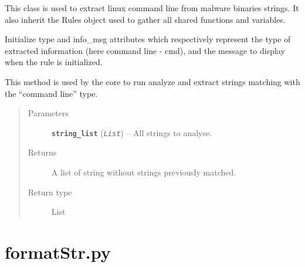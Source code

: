 \documentclass[letterpaper,10pt,oneside]{sphinxmanual}
\begin{document}
\begin{fulllineitems}
\label{index:lib.allRules.cmd.Cmd}
This class is used to extract linux command line from malware
binaries strings. It also inherit the Rules object used to gather
all shared functions and variables.

\begin{fulllineitems}
\label{index:lib.allRules.cmd.Cmd.__init__}
Initialize type and info\_msg attributes which respectively represent
the type of extracted information (here command line - cmd), and
the message to display when the rule is initialized.

\end{fulllineitems}


\begin{fulllineitems}
\label{index:lib.allRules.cmd.Cmd.run_analysis}
This method is used by the core to run analyze and extract strings
matching with the ``command line'' type.
\begin{quote}\begin{description}
\item[{Parameters}] \leavevmode
\textbf{\texttt{string\_list}} (\emph{\texttt{List}}) -- All strings to analyse.

\item[{Returns}] \leavevmode
A list of string without strings previously matched.

\item[{Return type}] \leavevmode
List

\end{description}\end{quote}

\end{fulllineitems}


\end{fulllineitems}



\section{formatStr.py}
\label{index:formatstr-py}\label{index:module-lib.allRules.formatStr}
\end{document}
